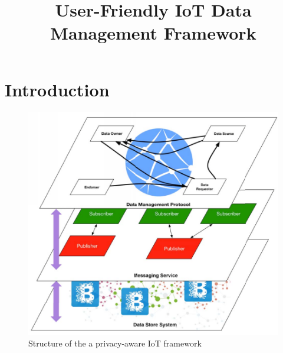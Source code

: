 \documentclass[conference]{IEEEtran}
\begin{document}
\title{User-Friendly IoT Data Management Framework}

\author{

}

\maketitle

\begin{abstract}

\end{abstract}

\section{Introduction}


\begin{figure}[t]
	\includegraphics[width=0.95\linewidth]{campbell_framework.png}
	\caption{Structure of the a privacy-aware IoT framework}
	\label{fig:framework_campbell}
\end{figure}
\end{document}
